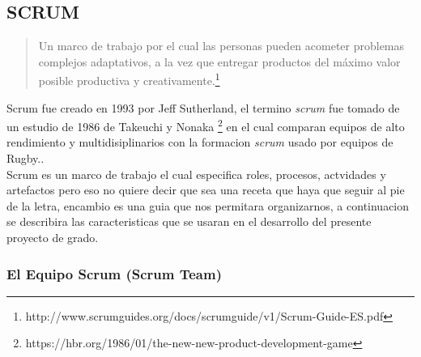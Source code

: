     \subsection{SCRUM}
    \label{sub:scrum}

      \begin{quote}

        Un marco de trabajo por el cual las personas pueden acometer problemas complejos adaptativos, a la vez que entregar productos del máximo valor posible productiva y creativamente.\footnote{http://www.scrumguides.org/docs/scrumguide/v1/Scrum-Guide-ES.pdf}

      \end{quote}

      Scrum fue creado en 1993 por Jeff Sutherland, el termino \emph{scrum} fue tomado de un estudio de 1986 de Takeuchi y Nonaka \footnote{https://hbr.org/1986/01/the-new-new-product-development-game} en el cual comparan equipos de alto rendimiento y multidisiplinarios con la formacion \emph{scrum} usado por equipos de Rugby.\cite{why_scrum}.\\

      Scrum es un marco de trabajo el cual especifica roles, procesos, actvidades y artefactos pero eso no quiere decir que sea una receta que haya que seguir al pie de la letra, encambio es una guia que nos permitara organizarnos, a continuacion se describira las caracteristicas que se usaran en el desarrollo del presente proyecto de grado.



      \subsubsection{El Equipo Scrum (Scrum Team)}
      \label{subs:scrum_team}

